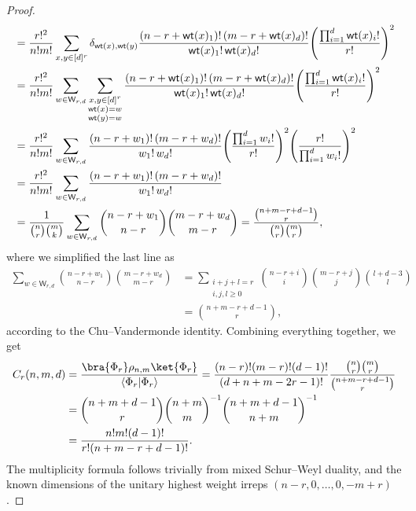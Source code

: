 \documentclass[aps,twocolumn,pra,superscriptaddress,nofootinbib]{revtex4-2}
\DeclarePairedDelimiter{\of}{\lparen}{\rparen}
\newcommand{\brakett}[2]{\langle #1 \vert #2 \rangle}
\begin{document}
\begin{proof}
\begin{align}
        &= \frac{r!^2}{n! m!} \sum_{x,y \in [d]^r} \delta_{\mathsf{wt}(x),\mathsf{wt}(y)} \frac{(n-r+\mathsf{wt}(x)_1)! \, (m-r+\mathsf{wt}(x)_d)!}{\mathsf{wt}(x)_1! \, \mathsf{wt}(x)_d!} \of*{\frac{\prod_{i=1}^d \mathsf{wt}(x)_i!}{r!}}^2 \\
        &= \frac{r!^2}{n! m!} \sum_{w \in \mathsf{W}_{r,d}} \sum_{\substack{x,y \in [d]^r \\ \mathsf{wt}(x)= w \\ \mathsf{wt}(y) = w}} \frac{(n-r+\mathsf{wt}(x)_1)! \, (m-r+\mathsf{wt}(x)_d)!}{\mathsf{wt}(x)_1! \, \mathsf{wt}(x)_d!} \of*{\frac{\prod_{i=1}^d \mathsf{wt}(x)_i!}{r!}}^2 \\
        &= \frac{r!^2}{n! m!} \sum_{w \in \mathsf{W}_{r,d}} \frac{(n-r+w_1)! \, (m-r+w_d)!}{w_1! \, w_d!} \of*{\frac{\prod_{i=1}^d w_i!}{r!}}^2 \of*{\frac{r!}{\prod_{i=1}^d w_i!}}^2 \\
        &= \frac{r!^2}{n! m!} \sum_{w \in \mathsf{W}_{r,d}} \frac{(n-r+w_1)! \, (m-r+w_d)!}{w_1! \, w_d!} \\
        &= \frac{1}{\binom{n}{r} \binom{m}{k}} \sum_{w \in \mathsf{W}_{r,d}} \binom{n-r+w_1}{n-r} \binom{m-r+w_d}{m-r} = \frac{\binom{n+m-r+d-1}{r}}{\binom{n}{r} \binom{m}{r}},
    \end{align}
    where we simplified the last line as
    \begin{align}
        \sum_{w \in \mathsf{W}_{r,d}} \binom{n-r+w_1}{n-r} \binom{m-r+w_d}{m-r} &= \sum_{\substack{i+j+l = r \\ i,j,l \geq 0}} \binom{n-r+i}{i} \binom{m-r+j}{j} \binom{l+d-3}{l} \\
        &= \binom{n+m-r+d-1}{r},
    \end{align}
    according to the Chu--Vandermonde identity. Combining everything together, we get
    \begin{align}
        C_r(n,m,d) &= \frac{\bra{\Phi_r}\rho_{n,m}\ket{\Phi_r}}{\brakett{\Phi_r}{\Phi_r}} = \frac{(n-r)!(m-r)!(d-1)!}{(d+n+m-2r-1)!} \frac{ \binom{n}{r} \binom{m}{r}}{\binom{n+m-r+d-1}{r}} \\
        &= \binom{n+m+d-1}{r} {\binom{n+m}{m}}^{-1} \binom{n+m+d-1}{n+m}^{-1} \\
        &= \frac{n!m!(d-1)!}{r!(n+m-r+d-1)!}.
    \end{align}
    The multiplicity formula follows trivially from mixed Schur--Weyl duality, and the known dimensions of the unitary highest weight irreps $(n-r,0,\dotsc,0,-m+r)$.
\end{proof}
\end{document}
